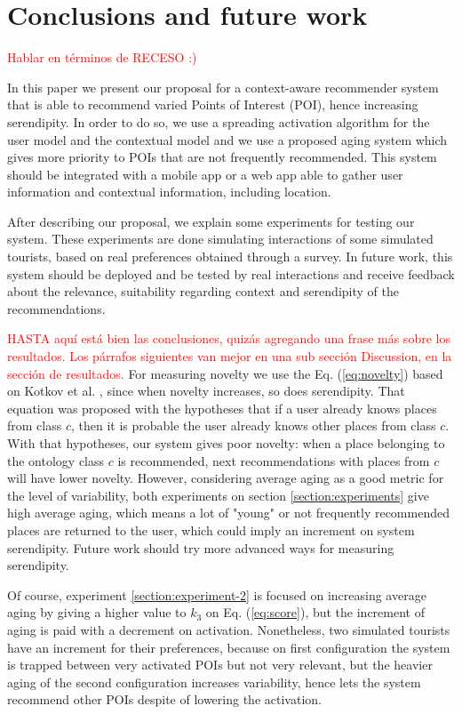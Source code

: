 \section{Conclusions and future work} \label{section:conclu}

\textcolor{red}{Hablar en términos de RECESO :)}

In this paper we present our proposal for a context-aware recommender system that is able to recommend varied Points of Interest (POI), hence increasing serendipity. In order to do so, we use a spreading activation algorithm for the user model and the contextual model and we use a proposed aging system which gives more priority to POIs that are not frequently recommended. This system should be integrated with a mobile app or a web app able to gather user information and contextual information, including location.

After describing our proposal, we explain some experiments for testing our system. These experiments are done simulating interactions of some simulated tourists, based on real preferences obtained through a survey. In future work, this system should be deployed and be tested by real interactions and receive feedback about the relevance, suitability regarding context and serendipity of the recommendations.

\textcolor{red}{HASTA aquí está bien las conclusiones, quizás agregando una frase más sobre los resultados. Los párrafos siguientes van mejor en una sub sección Discussion, en la sección de resultados. }
For measuring novelty we use the Eq. (\ref{eq:novelty}) based on Kotkov et al. \cite{kotkov2016survey}, since when novelty increases, so does serendipity. That equation was proposed with the hypotheses that if a user already knows places from class $c$, then it is probable the user already knows other places from class $c$. With that hypotheses, our system gives poor novelty: when a place belonging to the ontology class $c$ is recommended, next recommendations with places from $c$ will have lower novelty. However, considering average aging as a good metric for the level of variability, both experiments on section \ref{section:experiments} give high average aging, which means a lot of "young" or not frequently recommended places are returned to the user, which could imply an increment on system serendipity. Future work should try more advanced ways for measuring serendipity.

Of course, experiment \ref{section:experiment-2} is focused on increasing average aging by giving a higher value to $k_3$ on Eq. (\ref{eq:score}), but the increment of aging is paid with a decrement on activation. Nonetheless, two simulated tourists have an increment for their preferences, because on first configuration the system is trapped between very activated POIs but not very relevant, but the heavier aging of the second configuration increases variability, hence lets the system recommend other POIs despite of lowering the activation. 

